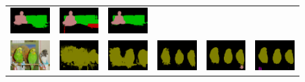 \begin{figure}[!htbp]
{\begin{tabular}{c c c c c c}
    \includegraphics[height=0.11\linewidth]{fig/val_crf_vis/bbox_crf/2009_001299.png} &
    \includegraphics[height=0.11\linewidth]{fig/val_crf_vis/strongweak/2009_001299.png} &
    \includegraphics[height=0.11\linewidth]{fig/val_crf_vis/cocomix/2009_001299.png} \\
    \includegraphics[height=0.123\linewidth]{fig/val_crf_vis/img/2010_004994.jpg} &
    \includegraphics[height=0.123\linewidth]{fig/val_crf_vis/adaweak/2010_004994.png} &
    \includegraphics[height=0.123\linewidth]{fig/val_crf_vis/bbox/2010_004994.png} &
    \includegraphics[height=0.123\linewidth]{fig/val_crf_vis/bbox_crf/2010_004994.png} &
    \includegraphics[height=0.123\linewidth]{fig/val_crf_vis/strongweak/2010_004994.png} &
    \includegraphics[height=0.123\linewidth]{fig/val_crf_vis/cocomix/2010_004994.png} \\

\end{tabular}}
\end{figure}
